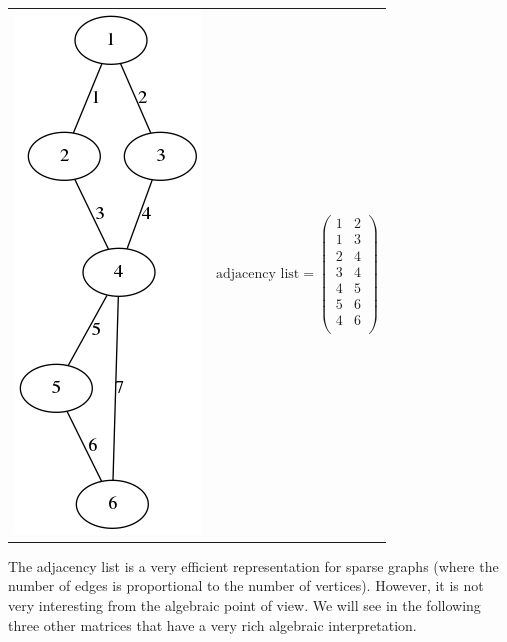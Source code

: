 \begin{tabular}{ll}
\includegraphics{graph2.png} &
\begin{equation*}
	\textrm{adjacency list} =
	\begin{pmatrix}
		1 & 2 \\
		1 & 3 \\
		2 & 4 \\
		3 & 4 \\
		4 & 5 \\
		5 & 6 \\
		4 & 6 \\
	\end{pmatrix}
\end{equation*}
\end{tabular}


The adjacency list is a very efficient representation for sparse graphs (where
the number of edges is proportional to the number of vertices).
However, it is not very interesting from the algebraic point of view.
We will see in the following three other matrices that have a very rich
algebraic interpretation.


